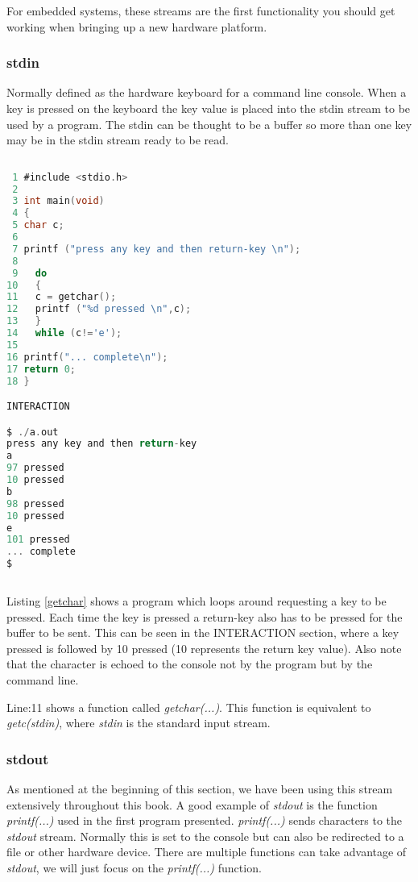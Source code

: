 For embedded systems, these streams are the first functionality you should get working when bringing up a new hardware platform. 

\subsubsection{stdin}

Normally defined as the hardware keyboard for a command line console. When a key is pressed on the keyboard the key value is placed into the stdin stream to be used by a program. The stdin can be thought to be a buffer so more than one key may be in the stdin stream ready to be read.

\begin{lstlisting}[language=C,showstringspaces=false,caption={File: getchar.c},captionpos=b,label=getchar]
	
 1 #include <stdio.h>
 2 
 3 int main(void)
 4 {
 5 char c;
 6 
 7 printf ("press any key and then return-key \n");
 8 
 9   do
10   {
11   c = getchar();
12   printf ("%d pressed \n",c);
13   }
14   while (c!='e');
15 
16 printf("... complete\n");
17 return 0;
18 }

INTERACTION

$ ./a.out
press any key and then return-key 
a
97 pressed 
10 pressed 
b
98 pressed 
10 pressed 
e
101 pressed 
... complete
$
 
\end{lstlisting}

Listing \ref{getchar} shows a program which loops around requesting a key to be pressed. Each time the key is pressed a return-key also has to be pressed for the buffer to be sent. This can be seen in the INTERACTION section, where a key pressed is followed by 10 pressed (10 represents the return key value). Also note that the character is echoed to the console not by the program but by the command line. 

Line:11 shows a function called \textit{getchar(...)}. This function is equivalent to \textit{getc(stdin)}, where \textit{stdin} is the standard input stream.

\subsubsection{stdout}

As mentioned at the beginning of this section, we have been using this stream extensively throughout this book. A good example of \textit{stdout} is the function \textit{printf(...)} used in the first program presented. \textit{printf(...)} sends characters to the \textit{stdout} stream. Normally this is set to the console but can also be redirected to a file or other hardware device. There are multiple functions can take advantage of \textit{stdout}, we will just focus on the \textit{printf(...)} function.


